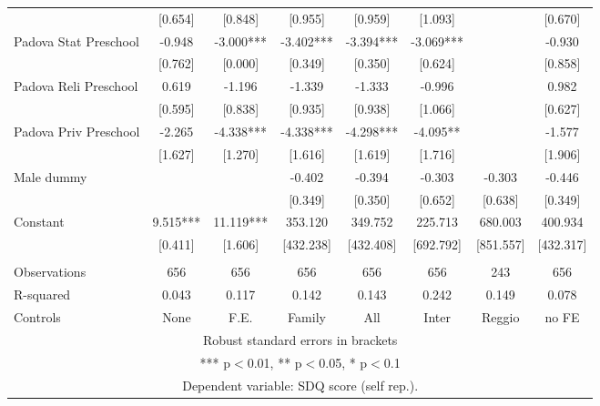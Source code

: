 \begin{tabular}{lccccccc}
 & [0.654] & [0.848] & [0.955] & [0.959] & [1.093] &  & [0.670] \\
Padova Stat Preschool & -0.948 & -3.000*** & -3.402*** & -3.394*** & -3.069*** &  & -0.930 \\
 & [0.762] & [0.000] & [0.349] & [0.350] & [0.624] &  & [0.858] \\
Padova Reli Preschool & 0.619 & -1.196 & -1.339 & -1.333 & -0.996 &  & 0.982 \\
 & [0.595] & [0.838] & [0.935] & [0.938] & [1.066] &  & [0.627] \\
Padova Priv Preschool & -2.265 & -4.338*** & -4.338*** & -4.298*** & -4.095** &  & -1.577 \\
 & [1.627] & [1.270] & [1.616] & [1.619] & [1.716] &  & [1.906] \\
Male dummy &  &  & -0.402 & -0.394 & -0.303 & -0.303 & -0.446 \\
 &  &  & [0.349] & [0.350] & [0.652] & [0.638] & [0.349] \\
Constant & 9.515*** & 11.119*** & 353.120 & 349.752 & 225.713 & 680.003 & 400.934 \\
 & [0.411] & [1.606] & [432.238] & [432.408] & [692.792] & [851.557] & [432.317] \\
 &  &  &  &  &  &  &  \\
Observations & 656 & 656 & 656 & 656 & 656 & 243 & 656 \\
R-squared & 0.043 & 0.117 & 0.142 & 0.143 & 0.242 & 0.149 & 0.078 \\
 Controls & None & F.E. & Family & All & Inter & Reggio & no FE \\ \hline
\multicolumn{8}{c}{ Robust standard errors in brackets} \\
\multicolumn{8}{c}{ *** p$<$0.01, ** p$<$0.05, * p$<$0.1} \\
\multicolumn{8}{c}{ Dependent variable: SDQ score (self rep.).} \\
\end{tabular}
